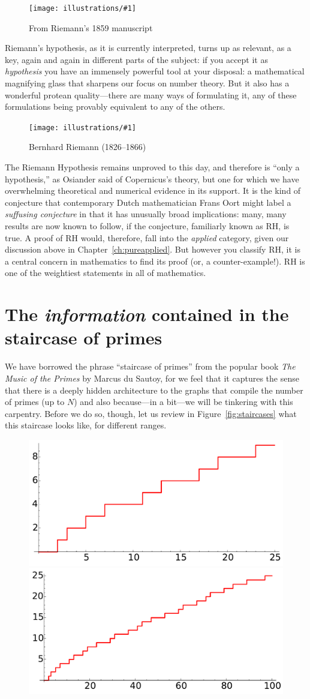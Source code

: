 \documentclass[openany]{book}
\newcommand{\ill}[3]{%
   \begin{figure}[H]%
   \vspace{-2ex}
   \centering%
   \texttt{[image: illustrations/\#1]}%
   \caption{#3}%
   \vspace{-2ex}
    \end{figure}}
\theoremstyle{plain}
\theoremstyle{definition}
\newcommand{\RH}{Riemann Hypothesis\index{Riemann Hypothesis}}
\begin{document}
{\ill{riemann_zoom}{1}{From Riemann's 1859 manuscript\label{fig:riemamn}}




Riemann's hypothesis, as it is currently interpreted, turns up as
relevant, as a key, again and again in different parts of the subject:
if you accept it as {\em hypothesis} you have an immensely powerful
tool at your disposal: a mathematical magnifying glass that sharpens
our focus on number theory. But it also has a wonderful protean
quality---there are many ways of formulating it, any of these
formulations being provably equivalent to any of the others.

\ill{riemann}{.3}{Bernhard Riemann (1826--1866)}


The \RH{} remains unproved to this day, and therefore is ``only a
hypothesis,'' as Osiander said of Copernicus's theory, but one for
which we have overwhelming theoretical and numerical evidence in its
support.  It is the kind of conjecture that contemporary Dutch
mathematician Frans Oort might label a {\em suffusing conjecture} in
that it has unusually broad implications: many, many results are now
known to follow, if the conjecture, familiarly known as RH, is true.
A proof of RH would, therefore, fall into the {\em applied} category,
given our discussion above in Chapter~\ref{ch:pureapplied}.  But
however you classify RH, it is a central concern in mathematics to
find its proof (or, a counter-example!).  RH is one of the weightiest
statements in all of mathematics.


\chapter[The staircase of primes]{The {\em information} contained in the staircase of primes\label{sec:information}}



We have borrowed the phrase ``staircase of primes'' from the popular
book {\em The Music of the Primes} by Marcus du Sautoy, for we feel that
it captures the sense that there is a deeply hidden architecture to
the graphs that compile the number of primes (up to $N$) and also
because---in a bit---we will be tinkering with this carpentry.  Before
we do so, though, let us review in Figure~\ref{fig:staircases}
what this staircase looks like, for
different ranges.

\begin{figure}[H]
\centering
\includegraphics[width=.4\textwidth]{illustrations/PN_25}
\includegraphics[width=.4\textwidth]{illustrations/PN_100}\\


\end{figure}}
\end{document}
